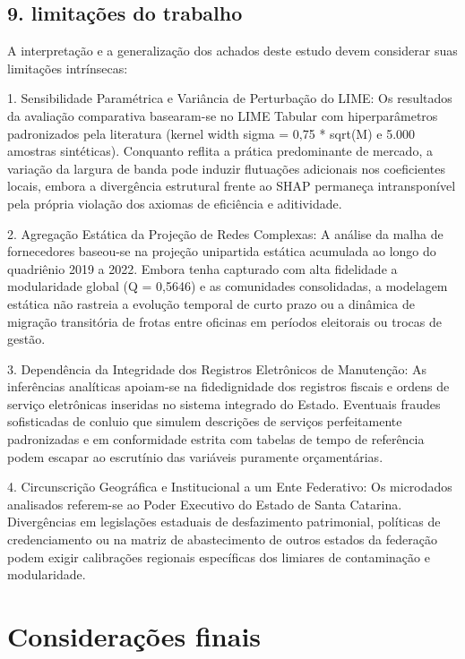 \documentclass[12pt,a4paper]{article}
\begin{document}
\subsection{9. limitações do trabalho}

A interpretação e a generalização dos achados deste estudo devem considerar suas limitações intrínsecas:

1. Sensibilidade Paramétrica e Variância de Perturbação do LIME: Os resultados da avaliação comparativa basearam-se no LIME Tabular com hiperparâmetros padronizados pela literatura (kernel width sigma = 0,75 * sqrt(M) e 5.000 amostras sintéticas). Conquanto reflita a prática predominante de mercado, a variação da largura de banda pode induzir flutuações adicionais nos coeficientes locais, embora a divergência estrutural frente ao SHAP permaneça intransponível pela própria violação dos axiomas de eficiência e aditividade.

2. Agregação Estática da Projeção de Redes Complexas: A análise da malha de fornecedores baseou-se na projeção unipartida estática acumulada ao longo do quadriênio 2019 a 2022. Embora tenha capturado com alta fidelidade a modularidade global (Q = 0,5646) e as comunidades consolidadas, a modelagem estática não rastreia a evolução temporal de curto prazo ou a dinâmica de migração transitória de frotas entre oficinas em períodos eleitorais ou trocas de gestão.

3. Dependência da Integridade dos Registros Eletrônicos de Manutenção: As inferências analíticas apoiam-se na fidedignidade dos registros fiscais e ordens de serviço eletrônicas inseridas no sistema integrado do Estado. Eventuais fraudes sofisticadas de conluio que simulem descrições de serviços perfeitamente padronizadas e em conformidade estrita com tabelas de tempo de referência podem escapar ao escrutínio das variáveis puramente orçamentárias.

4. Circunscrição Geográfica e Institucional a um Ente Federativo: Os microdados analisados referem-se ao Poder Executivo do Estado de Santa Catarina. Divergências em legislações estaduais de desfazimento patrimonial, políticas de credenciamento ou na matriz de abastecimento de outros estados da federação podem exigir calibrações regionais específicas dos limiares de contaminação e modularidade.


\section{Considerações finais}
\end{document}

